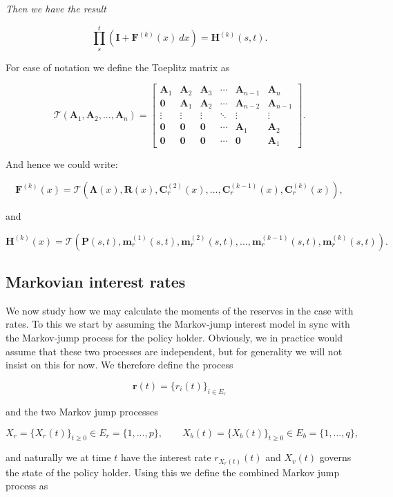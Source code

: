 \documentclass[a4paper,10pt,openany]{book}
\begin{document}
\emph{Then we have the result}

\[
\prod_s^t(\mathbf I + \mathbf F^{(k)}(x)\ dx)=\mathbf H^{(k)}(s,t).
\]

For ease of notation we define the Toeplitz matrix as

\[
\mathcal T(\mathbf A_1,\mathbf A_2,...,\mathbf A_n)=
\begin{bmatrix}
\mathbf A_1 & \mathbf A_2 & \mathbf A_3 & \cdots & \mathbf A_{n-1} & \mathbf A_n\\
\mathbf 0 & \mathbf A_1 & \mathbf A_2 & \cdots & \mathbf A_{n-2} & \mathbf A_{n-1}\\
\vdots & \vdots & \vdots & \ddots & \vdots & \vdots \\
\mathbf 0 & \mathbf 0 & \mathbf 0 & \cdots & \mathbf A_1 & \mathbf A_2\\
\mathbf 0 & \mathbf 0 & \mathbf 0 & \cdots & \mathbf 0 & \mathbf A_1
\end{bmatrix}.
\]

And hence we could write:

\[
\mathbf F^{(k)}(x)=\mathcal T(\mathbf \Lambda(x), \mathbf R(x) , \mathbf C^{(2)}_r(x) , ... , \mathbf C^{(k-1)}_r(x), \mathbf C^{(k)}_r(x)),
\]

and

\[
\mathbf H^{(k)}(x)=\mathcal T(\mathbf P(s,t) , \mathbf m_r^{(1)}(s,t) , \mathbf m_r^{(2)}(s,t), ...,\mathbf m_r^{(k-1)}(s,t) , \mathbf m_r^{(k)}(s,t)).
\]

\hypertarget{markovian-interest-rates}{%
\subsection{Markovian interest rates}\label{markovian-interest-rates}}

We now study how we may calculate the moments of the reserves in the case with rates. To this we start by assuming the Markov-jump interest model in sync with the Markov-jump process for the policy holder. Obviously, we in practice would assume that these two processes are independent, but for generality we will not insist on this for now. We therefore define the process

\[
\mathbf r(t)=\{r_i(t)\}_{i\in E_r}
\]

and the two Markov jump processes

\[
X_r=\{X_r(t)\}_{t\ge 0}\in E_r=\{1,...,p\},\qquad X_b(t)=\{X_b(t)\}_{t\ge 0}\in E_b=\{1,...,q\},
\]

and naturally we at time \(t\) have the interest rate \(r_{X_r(t)}(t)\) and \(X_v(t)\) governs the state of the policy holder. Using this we define the combined Markov jump process as
\end{document}
